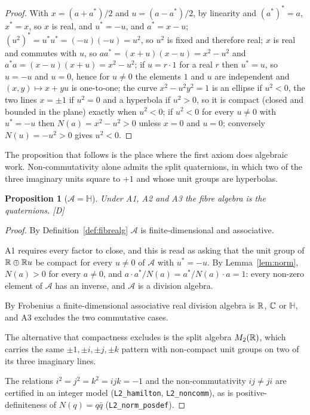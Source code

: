 \documentclass[11pt,a4paper]{article}
\theoremstyle{plain}
\newtheorem{proposition}[theorem]{Proposition}
\theoremstyle{definition}
\theoremstyle{remark}
\newcommand{\Hquat}{\mathbb{H}}
\newcommand{\rigD}{[\textup{D}]}
\begin{document}
\begin{proof}
With $x=(a+a^{*})/2$ and $u=(a-a^{*})/2$, by linearity and $(a^{*})^{*}=a$, $x^{*}=x$, so $x$ is real, and $u^{*}=-u$, and $a^{*}=x-u$; $(u^{2})^{*}=u^{*}u^{*}=(-u)(-u)=u^{2}$, so $u^{2}$ is fixed and therefore real; $x$ is real and commutes with $u$, so $aa^{*}=(x+u)(x-u)=x^{2}-u^{2}$ and $a^{*}a=(x-u)(x+u)=x^{2}-u^{2}$; if $u=r\cdot1$ for a real $r$ then $u^{*}=u$, so $u=-u$ and $u=0$, hence for $u\neq0$ the elements $1$ and $u$ are independent and $(x,y)\mapsto x+yu$ is one-to-one; the curve $x^{2}-u^{2}y^{2}=1$ is an ellipse if $u^{2}<0$, the two lines $x=\pm1$ if $u^{2}=0$ and a hyperbola if $u^{2}>0$, so it is compact (closed and bounded in the plane) exactly when $u^{2}<0$; if $u^{2}<0$ for every $u\neq0$ with $u^{*}=-u$ then $N(a)=x^{2}-u^{2}>0$ unless $x=0$ and $u=0$; conversely $N(u)=-u^{2}>0$ gives $u^{2}<0$.
\end{proof}

The proposition that follows is the place where the first axiom does algebraic work. Non-commutativity alone admits the split quaternions, in which two of the three imaginary units square to $+1$ and whose unit groups are hyperbolas.

\begin{proposition}[$\mathcal{A}=\Hquat$]\label{prop:H}
Under A1, A2 and A3 the fibre algebra is the quaternions. \rigD
\end{proposition}

\begin{proof}
By Definition~\ref{def:fibrealg} $\mathcal{A}$ is finite-dimensional and associative.

A1 requires every factor to close, and this is read as asking that the unit group of $\mathbb{R}\oplus\mathbb{R} u$ be compact for every $u\neq0$ of $\mathcal{A}$ with $u^{*}=-u$. By Lemma~\ref{lem:norm}, $N(a)>0$ for every $a\neq0$, and $a\cdot a^{*}/N(a)=a^{*}/N(a)\cdot a=1$: every non-zero element of $\mathcal{A}$ has an inverse, and $\mathcal{A}$ is a division algebra.

By Frobenius \cite{Frobenius1878} a finite-dimensional associative real division algebra is $\mathbb{R}$, $\mathbb{C}$ or $\Hquat$, and A3 excludes the two commutative cases.

The alternative that compactness excludes is the split algebra $M_{2}(\mathbb{R})$, which carries the same $\pm1,\pm i,\pm j,\pm k$ pattern with non-compact unit groups on two of its three imaginary lines.

The relations $i^{2}=j^{2}=k^{2}=ijk=-1$ and the non-commutativity $ij\neq ji$ are certified in an integer model (\texttt{L2\_hamilton}, \texttt{L2\_noncomm}), as is positive-definiteness of $N(q)=q\bar q$ (\texttt{L2\_norm\_posdef}).
\end{proof}
\end{document}
